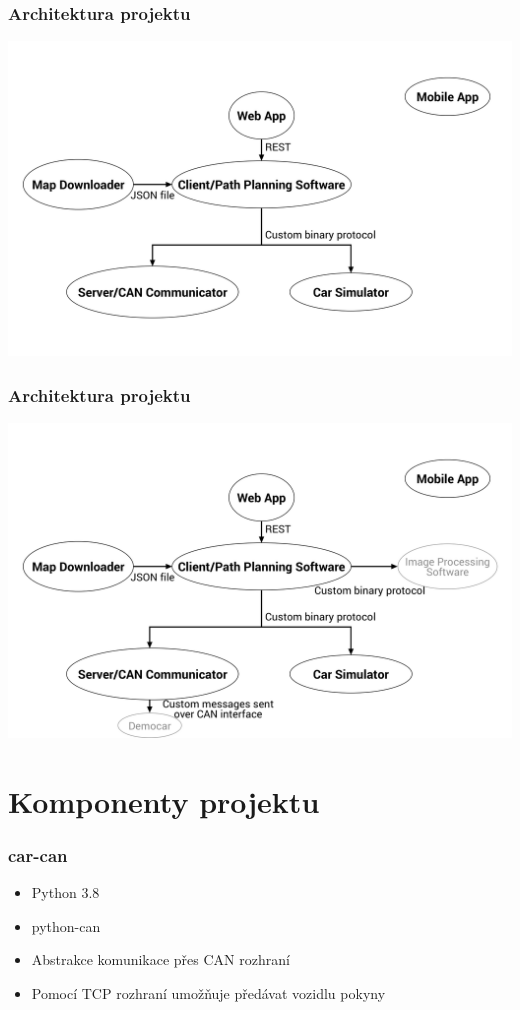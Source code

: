 \documentclass{beamer}
\begin{document}
\begin{frame}
    \frametitle{Architektura projektu}
    \begin{center}
        \includegraphics[width=0.9\columnwidth]{car-schema}
    \end{center}
\end{frame}

\begin{frame}
    \frametitle{Architektura projektu}
    \begin{center}
        \includegraphics[width=0.9\columnwidth]{car-schema-full}
    \end{center}
\end{frame}

\section{Komponenty projektu}

\begin{frame}
    \frametitle{car-can}
    \begin{itemize}
        \item Python 3.8
        \item python-can
        \item Abstrakce komunikace přes CAN rozhraní
        \item Pomocí TCP rozhraní umožňuje předávat vozidlu pokyny
    \end{itemize}
\end{frame}
\end{document}
